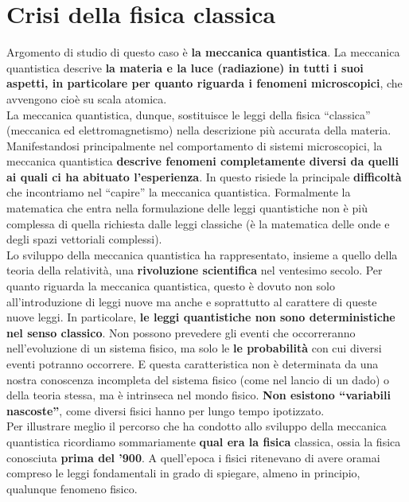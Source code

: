 \pagestyle{VS}
\chapter{Crisi della fisica classica}
Argomento di studio di questo caso è \textbf{la meccanica quantistica}. La meccanica quantistica descrive \textbf{la materia e la luce (radiazione) in tutti i suoi aspetti, in particolare per quanto riguarda i fenomeni microscopici}, che avvengono cioè su scala atomica.\\

La meccanica quantistica, dunque, sostituisce le leggi della fisica ``classica'' (meccanica ed elettromagnetismo) nella descrizione più accurata della materia. Manifestandosi principalmente nel comportamento di sistemi microscopici, la meccanica quantistica \textbf{descrive fenomeni completamente diversi da quelli ai quali ci ha abituato l'esperienza}. In questo risiede la principale \textbf{difficoltà} che incontriamo nel ``capire'' la meccanica quantistica. Formalmente la matematica che entra nella formulazione delle leggi quantistiche non è più complessa di quella richiesta dalle leggi classiche (è la matematica delle onde e degli spazi vettoriali complessi).\\

Lo sviluppo della meccanica quantistica ha rappresentato, insieme a quello della teoria della relatività, una \textbf{rivoluzione scientifica} nel ventesimo secolo. Per quanto riguarda la meccanica quantistica, questo è dovuto non solo all'introduzione di leggi nuove ma anche e soprattutto al carattere di queste nuove leggi. In particolare, \textbf{le leggi quantistiche non sono deterministiche nel senso classico}. Non possono prevedere gli eventi che occorreranno nell'evoluzione di un sistema fisico, ma solo le \textbf{le probabilità} con cui diversi eventi potranno occorrere. E questa caratteristica non è determinata da una nostra conoscenza incompleta del sistema fisico (come nel lancio di un dado) o della teoria stessa, ma è intrinseca nel mondo fisico. \textbf{Non esistono ``variabili nascoste''}, come diversi fisici hanno per lungo tempo ipotizzato.\\

Per illustrare meglio il percorso che ha condotto allo sviluppo della meccanica quantistica ricordiamo sommariamente \textbf{qual era la fisica} classica, ossia la fisica conosciuta \textbf{prima del '900}.  A quell'epoca i fisici ritenevano di avere oramai compreso le leggi fondamentali in grado di spiegare, almeno in principio, qualunque fenomeno fisico.\\

